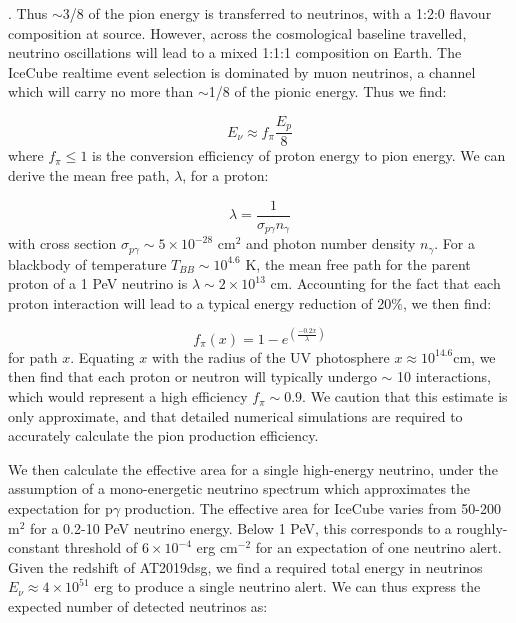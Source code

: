 . Thus $\sim$3/8 of the pion energy is transferred to neutrinos, with a 1:2:0 flavour composition at source. However, across the cosmological baseline travelled, neutrino oscillations will lead to a mixed 1:1:1 composition on Earth. The IceCube realtime event selection is dominated by muon neutrinos, a channel which will carry no more than $\sim$1/8 of the pionic energy. Thus we find:

\begin{equation}
E_{\nu} \approx f_{\pi} \frac{E_{p}}{8}
\end{equation} where $f_{\pi} \leq1$ is the conversion efficiency of proton energy to pion energy. We can derive the mean free path, $\lambda$, for a proton:

\begin{equation}
\lambda = \frac{1}{\sigma_{p\gamma} n_{\gamma}}
\end{equation} with cross section $\sigma_{p\gamma} \sim 5 \times 10^{-28}$ cm$^{2}$ and photon number density $n_{\gamma}$. For a blackbody of temperature $T_{BB} \sim 10^{4.6}$ K, the mean free path for the parent proton of a 1 PeV neutrino is $\lambda \sim 2 \times 10^{13}$ cm. Accounting for the fact that each proton interaction will lead to a typical energy reduction of 20\%, we then find:

\begin{equation}
f_{\pi}(x) = 1 - e^{\left( \frac{-0.2x}{\lambda} \right)}
\end{equation} for path $x$. Equating $x$ with the radius of the UV photosphere $x \approx 10^{14.6}$cm, we then find that each proton or neutron will typically undergo $\sim$ 10 interactions, which would represent a high efficiency $f_{\pi} \sim 0.9$. We caution that this estimate is only approximate, and that detailed numerical simulations are required to accurately calculate the pion production efficiency\cite{2010ApJ...721..630H}.

We then calculate the effective area for a single high-energy neutrino, under the assumption of a mono-energetic neutrino spectrum which approximates the expectation for p$\gamma$ production. The effective area for IceCube varies from 50-200 m$^{2}$ for a 0.2-10 PeV neutrino energy. Below 1 PeV, this corresponds to a roughly-constant threshold of $6 \times 10^{-4}$ erg cm$^{-2}$ for an expectation of one neutrino alert. Given the redshift of AT2019dsg, we find a required total energy in neutrinos $E_{\nu} \approx 4 \times 10^{51}$ erg to produce a single neutrino alert. 
We can thus express the expected number of detected neutrinos as:


